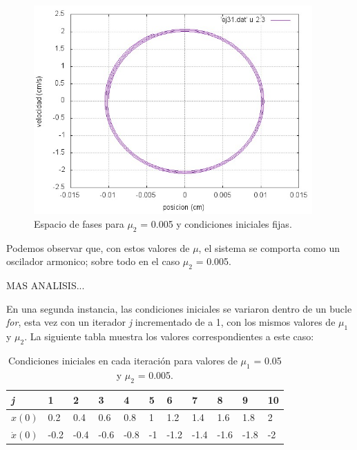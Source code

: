 \documentclass[a4paper,12pt]{article}
\begin{document}
\begin{itemize}
\begin{figure}[H]
\begin{center}
\includegraphics[height=8cm]{grafico_ej31_xVSv.jpg}
\caption[width=5cm]{Espacio de fases para $\mu_2$ = 0.005 y condiciones iniciales fijas.}
\end{center}
\end{figure}

Podemos observar que, con estos valores de $\mu$, el sistema se comporta como un oscilador armonico; sobre todo en el caso $\mu_2$ = 0.005.

MAS ANALISIS...


En una segunda instancia, las condiciones iniciales se variaron dentro de un bucle \textit{for}, esta vez con un iterador \textit{j} incrementado de a 1, con los mismos valores de $\mu_1$ y $\mu_2$. La siguiente tabla muestra los valores correspondientes a este caso:

\begin{table}
	\centering
    \begin{tabular}{| l | l | l | l | l | l | l | l | l | l |p{1cm}|}
    \hline
    \textit{j} & 1 & 2 & 3 & 4 & 5 & 6 & 7 & 8 & 9 & 10 \\ \hline
    $x(0)$ & 0.2 & 0.4 & 0.6 & 0.8 & 1 & 1.2 & 1.4 & 1.6 & 1.8 & 2 \\ \hline
    $\dot{x}(0)$ & -0.2 & -0.4 & -0.6 & -0.8 & -1 & -1.2 & -1.4 & -1.6 & -1.8 & -2 \\
    \hline
    \end{tabular}
    \caption{Condiciones iniciales en cada iteraci\'on para valores de $\mu_1$ = 0.05 y $\mu_2$ = 0.005.}
    \label{table:2}
\end{table}




\end{itemize}
\end{document}
